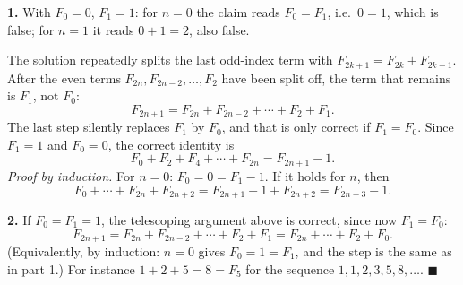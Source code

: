 \textbf{1.} With $F_0=0$, $F_1=1$: for $n=0$ the claim reads $F_0=F_1$, i.e.\ $0=1$, which is false; for $n=1$ it reads $0+1=2$, also false.

The solution repeatedly splits the last odd-index term with $F_{2k+1}=F_{2k}+F_{2k-1}$. After the even terms $F_{2n},F_{2n-2},\dots,F_2$ have been split off, the term that remains is $F_1$, not $F_0$:
\[
F_{2n+1}=F_{2n}+F_{2n-2}+\cdots+F_2+F_1 .
\]
The last step silently replaces $F_1$ by $F_0$, and that is only correct if $F_1=F_0$. Since $F_1=1$ and $F_0=0$, the correct identity is
\[
\boxed{F_0+F_2+F_4+\cdots+F_{2n}=F_{2n+1}-1}.
\]
\emph{Proof by induction.} For $n=0$: $F_0=0=F_1-1$. If it holds for $n$, then
\[
F_0+\cdots+F_{2n}+F_{2n+2}=F_{2n+1}-1+F_{2n+2}=F_{2n+3}-1 .
\]

\textbf{2.} If $F_0=F_1=1$, the telescoping argument above is correct, since now $F_1=F_0$:
\[
F_{2n+1}=F_{2n}+F_{2n-2}+\cdots+F_2+F_1=F_{2n}+\cdots+F_2+F_0 .
\]
(Equivalently, by induction: $n=0$ gives $F_0=1=F_1$, and the step is the same as in part 1.) For instance $1+2+5=8=F_5$ for the sequence $1,1,2,3,5,8,\dots$. $\blacksquare$
